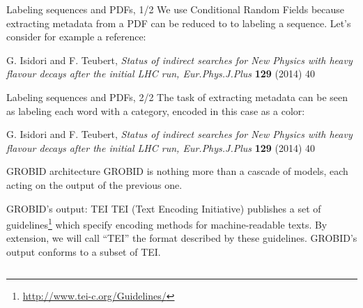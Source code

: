 \documentclass[10pt]{beamer}
\begin{document}
  \begin{frame}{Labeling sequences and PDFs, 1/2}
    We use Conditional Random Fields because extracting metadata from a PDF can
    be reduced to to labeling a sequence.  Let's consider for example a
    reference:

    \vspace{0.5cm}

    \begin{framed}
      G. Isidori and F. Teubert, \textit{Status of indirect searches for New Physics with heavy flavour decays after the initial LHC run, Eur.Phys.J.Plus} \textbf{129} (2014) 40
    \end{framed}
  \end{frame}

  \begin{frame}{Labeling sequences and PDFs, 2/2}
    The task of extracting metadata can be seen as labeling each word with a
    category, encoded in this case as a color:

    \vspace{0.5cm}

    \begin{framed}
      \color{blue}G. Isidori and F. Teubert, \color{red}\textit{Status of indirect searches for New Physics with heavy flavour decays after the initial LHC run, \color{green}Eur.Phys.J.Plus} \color{green}\textbf{129} (2014) 40\color{black}
    \end{framed}
  \end{frame}

  \begin{frame}{GROBID architecture}
    GROBID is nothing more than a cascade of models, each acting on the output
    of the previous one.

    \vspace{0.5cm}

  \end{frame}

  \begin{frame}{GROBID's output: TEI}
    TEI (Text Encoding Initiative) publishes a set of
    guidelines\footnote{\url{http://www.tei-c.org/Guidelines/}} which specify
    encoding methods for machine-readable texts. By extension, we will call ``TEI''
    the format described by these guidelines. GROBID's output conforms to a subset
    of TEI.

    \vspace{0.5cm}

    \inputminted[fontsize=\tiny]{xml}{tex/src/reference.xml}
  \end{frame}
\end{document}
